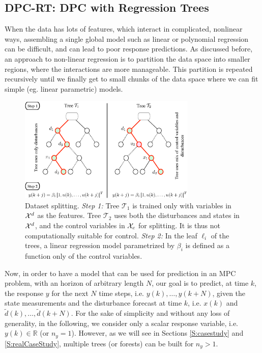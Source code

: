 \subsection{DPC-RT: DPC with Regression Trees}
\label{SS:dpcrt}
When the data has lots of features, which interact in complicated, nonlinear ways, assembling a single global model such as linear or polynomial regression can be difficult, and can lead to poor response predictions.
\textcolor[rgb]{0,0,1}{As discussed before, an approach to non-linear regression is to partition the data space into smaller regions, where the interactions are more manageable. }
This partition is repeated recursively until we finally get to small chunks of the data space where we can fit simple (eg. linear parametric) models. 

\begin{figure}[t!]
	\centering
	\includegraphics[width=20pc]{figures/dpc-sepvars.eps}
	\caption{Dataset splitting. \textit{Step 1:} Tree $\mathcal{T}_1$ is trained only with variables in $\mathcal{X}^d$ as the features. Tree $\mathcal{T}_2$ uses both the disturbances and states in $\mathcal{X}^d$, and the control variables in $\mathcal{X}_c$ for splitting. It is thus not computationally suitable for control. \textit{Step 2:} In the leaf $\ell_i$ of the trees, a linear regression model parametrized by $\beta_i$ is defined as a function only of the control variables.}
	\captionsetup{justification=centering}
	\label{F:dpc-sepvars}
\end{figure}

\textcolor[rgb]{0,0,1}{Now, in order to have a model that can be used for prediction in an MPC problem, with an horizon of arbitrary length $N$, our goal is to predict, at time $k$, the response $y$ for the next $N$ time steps, i.e. $y(k),\ldots,y(k+N)$, given the state measurements and the disturbance forecast at time $k$, i.e. $x(k)$ and $\tilde d(k),\ldots,\tilde d(k+N)$.
For the sake of simplicity and without any loss of generality, in the following, we consider only a scalar response variable, i.e. $y(k)\in\mathbb{R}$ (or $n_y = 1$).
However, as we will see in Sections \ref{S:casestudy} and \ref{S:realCaseStudy}, multiple trees (or forests) can be built for $n_y > 1$.}

